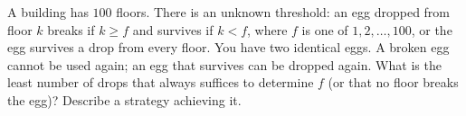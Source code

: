 A building has $100$ floors. There is an unknown threshold: an egg dropped from floor $k$ breaks if $k\ge f$ and survives if $k<f$, where $f$ is one of $1,2,\dots,100$, or the egg survives a drop from every floor. You have two identical eggs. A broken egg cannot be used again; an egg that survives can be dropped again. What is the least number of drops that always suffices to determine $f$ (or that no floor breaks the egg)? Describe a strategy achieving it.
